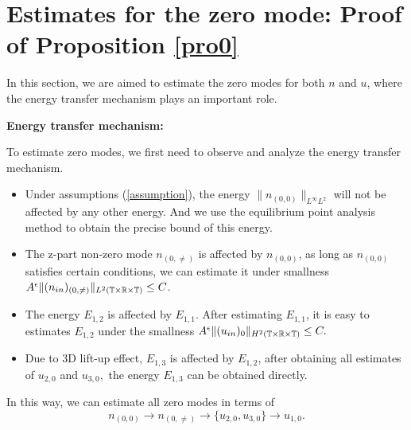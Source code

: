 \documentclass[12pt, reqno]{amsart}
\numberwithin{equation}{section}
\begin{document}
	\section{Estimates for the zero mode: Proof of Proposition \ref{pro0}}
	In this section, we are aimed to estimate the zero modes for both $n$ and 
	$u$, where the energy transfer mechanism plays an important role.
	
	\noindent\textbf{Energy transfer mechanism:}
	
	To estimate zero modes, we first need to observe and analyze the energy transfer mechanism.
	\begin{itemize}
		\item Under assumptions (\ref{assumption}), the energy $\|n_{(0,0)}\|_{L^{\infty}L^2}$ will not be affected by any other energy. And we use the equilibrium point analysis method to obtain the precise bound of this energy.
		\item  	The z-part non-zero mode $n_{(0,\neq)}$ is affected by $n_{(0,0)}$, as long as $ n_{(0,0)} $ satisfies certain conditions, we can estimate it under smallness $A^{\epsilon}\|(n_{\rm in})_{(0,\neq)}\|_{L^2(\mathbb{T}\times\mathbb{R}\times\mathbb{T})}\leq C$.
		\item The energy $E_{1,2}$ is affected by $E_{1,1}$.
		After estimating $E_{1,1}$, it is easy to 
		estimates  $E_{1,2}$ under the smallness $A^{\epsilon}\|(u_{\rm in})_{0}\|_{H^2(\mathbb{T}\times\mathbb{R}\times\mathbb{T})}\leq C.$
		\item Due to 3D lift-up effect, $E_{1,3}$ is affected by $E_{1,2}$,
		after obtaining all estimates of $u_{2,0}$ and $u_{3,0},$ the energy $E_{1,3}$ can be obtained directly.
	\end{itemize} 
	In this way, we can estimate all zero modes in terms of
	$$n_{(0,0)}\rightarrow n_{(0,\neq)}\rightarrow \{u_{2,0}, u_{3,0}\}\rightarrow u_{1,0}.$$	
\end{document}
